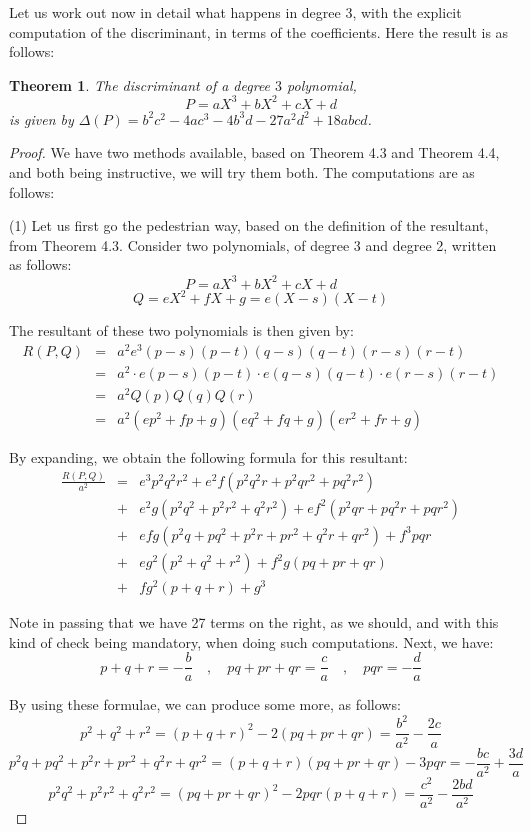 \documentclass[12pt]{amsbook}
\newtheorem{theorem}{Theorem}[chapter]
\begin{document}
Let us work out now in detail what happens in degree 3, with the explicit computation of the discriminant, in terms of the coefficients. Here the result is as follows:

\begin{theorem}
The discriminant of a degree $3$ polynomial,
$$P=aX^3+bX^2+cX+d$$
is given by $\Delta(P)=b^2c^2-4ac^3-4b^3d-27a^2d^2+18abcd$.
\end{theorem}

\begin{proof}
We have two methods available, based on Theorem 4.3 and Theorem 4.4, and both being instructive, we will try them both. The computations are as follows:

\medskip

(1) Let us first go the pedestrian way, based on the definition of the resultant, from Theorem 4.3. Consider two polynomials, of degree 3 and degree 2, written as follows:
$$P=aX^3+bX^2+cX+d$$
$$Q=eX^2+fX+g=e(X-s)(X-t)$$

The resultant of these two polynomials is then given by:
\begin{eqnarray*}
R(P,Q)
&=&a^2e^3(p-s)(p-t)(q-s)(q-t)(r-s)(r-t)\\
&=&a^2\cdot e(p-s)(p-t)\cdot e(q-s)(q-t)\cdot e(r-s)(r-t)\\
&=&a^2Q(p)Q(q)Q(r)\\
&=&a^2(ep^2+fp+g)(eq^2+fq+g)(er^2+fr+g)
\end{eqnarray*}

By expanding, we obtain the following formula for this resultant:
\begin{eqnarray*}
\frac{R(P,Q)}{a^2}
&=&e^3p^2q^2r^2+e^2f(p^2q^2r+p^2qr^2+pq^2r^2)\\
&+&e^2g(p^2q^2+p^2r^2+q^2r^2)+ef^2(p^2qr+pq^2r+pqr^2)\\
&+&efg(p^2q+pq^2+p^2r+pr^2+q^2r+qr^2)+f^3pqr\\
&+&eg^2(p^2+q^2+r^2)+f^2g(pq+pr+qr)\\
&+&fg^2(p+q+r)+g^3
\end{eqnarray*}

Note in passing that we have 27 terms on the right, as we should, and with this kind of check being mandatory, when doing such computations. Next, we have:
$$p+q+r=-\frac{b}{a}\quad,\quad
pq+pr+qr=\frac{c}{a}\quad,\quad 
pqr=-\frac{d}{a}$$

By using these formulae, we can produce some more, as follows:
$$p^2+q^2+r^2=(p+q+r)^2-2(pq+pr+qr)=\frac{b^2}{a^2}-\frac{2c}{a}$$
$$p^2q+pq^2+p^2r+pr^2+q^2r+qr^2=(p+q+r)(pq+pr+qr)-3pqr=-\frac{bc}{a^2}+\frac{3d}{a}$$
$$p^2q^2+p^2r^2+q^2r^2=(pq+pr+qr)^2-2pqr(p+q+r)=\frac{c^2}{a^2}-\frac{2bd}{a^2}$$


\end{proof}
\end{document}
